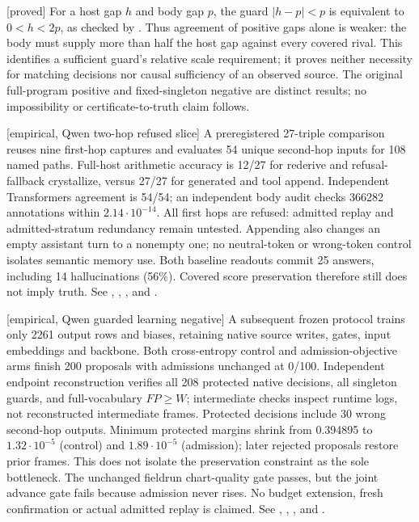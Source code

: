 \documentclass[11pt]{article}
\newcommand{\status}[1]{\textsf{[#1]}}
\begin{document}
\status{proved} For a host gap $h$ and body gap $p$, the guard
$|h-p|<p$ is equivalent to $0<h<2p$, as checked by
. Thus agreement of positive
gaps alone is weaker: the body must supply more than half the host gap
against every covered rival. This identifies a sufficient guard's relative
scale requirement; it proves neither necessity for matching decisions nor
causal sufficiency of an observed source. The original full-program positive
and fixed-singleton negative are distinct results; no impossibility or
certificate-to-truth claim follows.

\status{empirical, Qwen two-hop refused slice} A preregistered 27-triple
comparison reuses nine first-hop captures and evaluates 54 unique second-hop
inputs for 108 named paths. Full-host arithmetic accuracy is 12/27 for
rederive and refusal-fallback crystallize, versus 27/27 for generated and
tool append. Independent Transformers agreement is 54/54; an independent
body audit checks 366282 annotations within $2.14\cdot10^{-14}$.
All first hops are refused: admitted replay and admitted-stratum redundancy
remain untested. Appending also changes an empty assistant turn to a nonempty
one; no neutral-token or wrong-token control isolates semantic memory use.
Both baseline readouts commit 25 answers, including 14 hallucinations
(56\%). Covered score preservation therefore still does not imply truth.
See ,
, , and .

\status{empirical, Qwen guarded learning negative} A subsequent frozen
protocol trains only 2261 output rows and biases, retaining native source
writes, gates, input embeddings and backbone. Both cross-entropy control
and admission-objective arms finish 200 proposals with admissions unchanged
at 0/100. Independent endpoint reconstruction verifies all 208 protected
native decisions, all singleton guards, and full-vocabulary $FP\ge W$;
intermediate checks inspect runtime logs, not reconstructed intermediate
frames. Protected decisions include 30 wrong second-hop outputs. Minimum
protected margins shrink from 0.394895 to $1.32\cdot10^{-5}$ (control) and
$1.89\cdot10^{-5}$ (admission); later rejected proposals restore prior frames.
This does not isolate the preservation constraint as the sole bottleneck.
The unchanged fieldrun chart-quality gate passes, but the joint advance
gate fails because admission never rises. No budget extension, fresh
confirmation or actual admitted replay is claimed. See
,
,
, and
.
\end{document}
